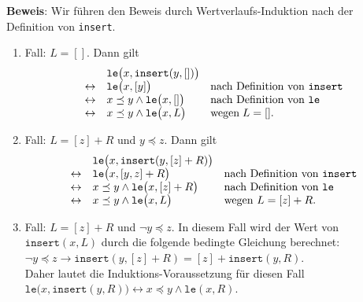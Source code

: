 \noindent
\textbf{Beweis}: Wir f\"uhren den Beweis durch Wertverlaufs-Induktion nach der Definition von \texttt{insert}.
\begin{enumerate}
\item Fall:  $L = []$.   Dann gilt 
      $$
      \begin{array}{lll}
                       & \mathtt{le}\bigl(x, \mathtt{insert}(y,[]) \bigr)                                        \\
       \leftrightarrow & \mathtt{le}\bigl(x, [y] \bigr)                   & \mbox{nach Definition von \texttt{insert}} \\
       \leftrightarrow & x \preceq y \wedge \mathtt{le}\bigl(x, [] \bigr) & \mbox{nach Definition von \texttt{le}}     \\
       \leftrightarrow & x \preceq y \wedge \mathtt{le}\bigl(x, L \bigr) & \mbox{wegen}\; L = []. 
      \end{array}
      $$
\item Fall: $L = [z] + R$ und $y \preceq z$.  Dann gilt 
            $$ 
            \begin{array}{cll}
                            & \mathtt{le}\bigl( x, \mathtt{insert}(y, [z] + R)\bigr) \\
            \leftrightarrow & \mathtt{le}\bigl( x, [y,z] + R\bigr)                   & \mbox{nach Definition von \texttt{insert}}\\
            \leftrightarrow & x \preceq y \wedge \mathtt{le}\bigl( x, [z] + R\bigr)  & \mbox{nach Definition von \texttt{le}}\\
            \leftrightarrow & x \preceq y \wedge \mathtt{le}\bigl( x, L\bigr)        & \mbox{wegen $L = [z] + R$}.
            \end{array}
            $$
\item Fall: $L = [z] + R$ und $\neg y \preceq z$.  
            In diesem Fall wird der Wert von $\texttt{insert}(x,L)$ durch die folgende
            bedingte Gleichung berechnet: \\[0.1cm]
            \hspace*{1.3cm} 
            $\neg y \preceq z \rightarrow \mathtt{insert}(y, [z] + R) = [z] + \mathtt{insert}(y,R)$. \\[0.1cm]
            Daher lautet die Induktions-Voraussetzung f\"ur diesen Fall \\[0.1cm]
            \hspace*{1.3cm} 
            $\mathtt{le}\bigl(x, \mathtt{insert}(y,R)\bigr) \leftrightarrow x \preceq y \wedge \mathtt{le}(x, R)$. 

\end{enumerate}
